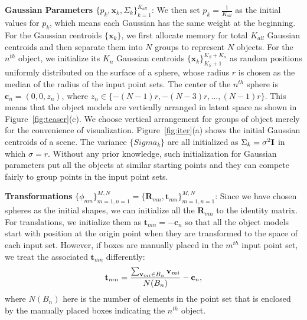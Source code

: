 \noindent\textbf{Gaussian Parameters $\{p_k,\mathbf{x}_k,\Sigma_k\}_{k=1}^{K_{all}}$}:
We then set $p_k=\frac{1}{K_{all}}$ as the initial values for $p_k$, which means each Gaussian has the same weight at the beginning. 
%
For the Gaussian centroids $\{\mathbf{x}_k\}$, we first allocate memory for total $K_{all}$ Gaussian centroids and then separate them into $N$ groups to represent $N$ objects. 
For the $n^{th}$ object, we initialize its $K_n$ Gaussian centroids $\{\mathbf{x}_k\}_{K_S+1}^{K_S+K_n}$ as random positions uniformly distributed on the surface of a sphere, whose radius $r$ is chosen as the median of the radius of the input point sets. 
%
The center of the $n^{th}$ sphere is $\mathbf{c}_n=(0,0,z_n)$, where $z_n\in \{-(N-1)r,-(N-3)r,...,(N-1)r\}$.
%
This means that the object models are vertically arranged in latent space as shown in Figure~\ref{fig:teaser}(c). 
%
We choose vertical arrangement for groups of object merely for the convenience of visualization.
%
Figure~\ref{fig:iter}(a)  shows the initial Gaussian centroids of a scene.
%
The variance $\{Sigma_k\}$ are all initialized as $\Sigma_k=\sigma^2 \mathbf{I}$ in which $\sigma=r$.
Without any prior knowledge, such initialization for Gaussian parameters put all the objects at similar starting points and they can compete fairly to group points in the input point sets.   

\noindent\textbf{Transformations} $\{\phi_{mn}\}_{m=1,n=1}^{M,N}=\{\mathbf{R}_{mn},\mathbf{t}_{mn}\}_{m=1,n=1}^{M,N}$:
Since we have chosen spheres as the initial shapes, we can initialize all the $\mathbf{R}_{mn}$ to the identity matrix.
%
%
For translations, we initialize them as $\mathbf{t}_{mn}=- \mathbf{c}_n$ so that all the object models start with position at the origin point when they are transformed to the space of each input set. 
%
However, if boxes are manually placed in the $m^{th}$ input point set, we treat the associated $\mathbf{t}_{mn}$ differently:
%
\begin{equation}
	\label{equ:initt}
	\mathbf{t}_{mn}=\frac{\sum_{\mathbf{v}_{mi} \in B_n}\mathbf{v}_{mi}}{N(B_n)}-\mathbf{c}_n, 
\end{equation}
where $N(B_n)$ here is the number of elements in the point set that is enclosed by the manually placed boxes indicating the $n^{th}$ object.



